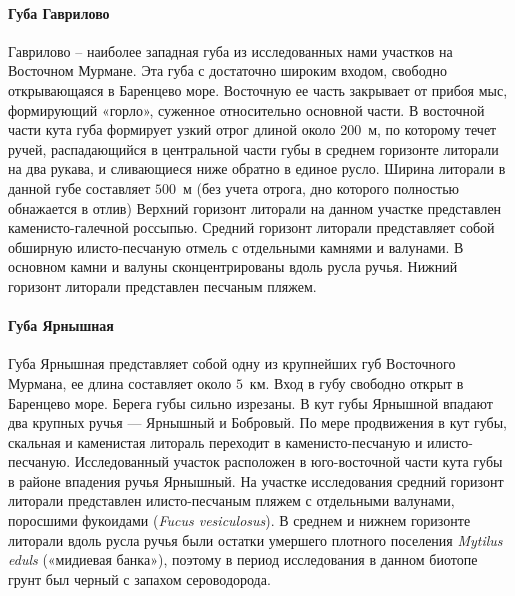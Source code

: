     \paragraph{Губа Гаврилово}
Гаврилово – наиболее западная губа из исследованных нами участков на Восточном Мурмане. 
Эта   губа   с  достаточно   широким   входом,   свободно   открывающаяся  в  Баренцево море.   
Восточную   ее   часть   закрывает   от   прибоя   мыс,   формирующий   «горло», суженное относительно основной части. 
В восточной части кута губа формирует узкий отрог длиной   около $200$~м, по которому течет ручей, распадающийся в центральной части   губы  в  среднем   горизонте   литорали   на   два   рукава,   и   сливающиеся   ниже   обратно   в единое русло.
Ширина литорали  в  данной губе составляет  $500$~м  (без  учета отрога, дно которого полностью обнажается в отлив) Верхний горизонт литорали на данном участке представлен каменисто-галечной   россыпью.   
Средний   горизонт   литорали   представляет   собой   обширную илисто-песчаную   отмель   с   отдельными   камнями   и   валунами.  
В   основном   камни   и   валуны сконцентрированы   вдоль   русла   ручья.   
Нижний   горизонт   литорали   представлен   песчаным пляжем. 

    \paragraph{Губа Ярнышная}
Губа Ярнышная представляет собой одну из крупнейших губ Восточного Мурмана, ее длина составляет около $5$~км. 
Вход в губу свободно открыт в Баренцево море. 
Берега губы сильно изрезаны. 
В кут губы Ярнышной впадают два крупных ручья --- Ярнышный и Бобровый. 
По мере продвижения в кут губы, скальная и каменистая литораль переходит в каменисто-песчаную и илисто-песчаную. 
Исследованный участок расположен в юго-восточной части кута губы в районе впадения ручья Ярнышный.
На   участке   исследования   средний   горизонт   литорали   представлен   илисто-песчаным пляжем   с   отдельными   валунами,   поросшими   фукоидами   ({\it Fucus   vesiculosus}).   
В   среднем   и нижнем горизонте литорали вдоль русла ручья были остатки умершего плотного поселения  {\it Mytilus eduls} («мидиевая банка»), поэтому в период исследования в данном биотопе грунт был черный с запахом сероводорода.

